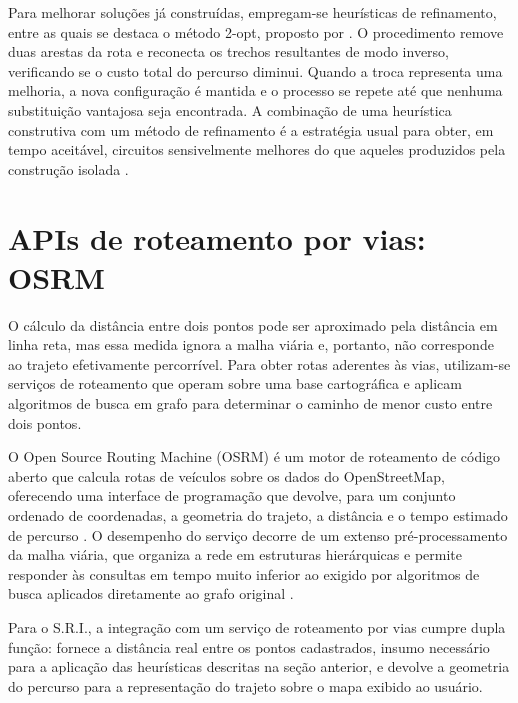Para melhorar soluções já construídas, empregam-se heurísticas de refinamento, entre as quais se destaca o método 2-opt, proposto por . O procedimento remove duas arestas da rota e reconecta os trechos resultantes de modo inverso, verificando se o custo total do percurso diminui. Quando a troca representa uma melhoria, a nova configuração é mantida e o processo se repete até que nenhuma substituição vantajosa seja encontrada. A combinação de uma heurística construtiva com um método de refinamento é a estratégia usual para obter, em tempo aceitável, circuitos sensivelmente melhores do que aqueles produzidos pela construção isolada \cite{croes1958}.

\section{APIs de roteamento por vias: OSRM}

O cálculo da distância entre dois pontos pode ser aproximado pela distância em linha reta, mas essa medida ignora a malha viária e, portanto, não corresponde ao trajeto efetivamente percorrível. Para obter rotas aderentes às vias, utilizam-se serviços de roteamento que operam sobre uma base cartográfica e aplicam algoritmos de busca em grafo para determinar o caminho de menor custo entre dois pontos.

O Open Source Routing Machine (OSRM) é um motor de roteamento de código aberto que calcula rotas de veículos sobre os dados do OpenStreetMap, oferecendo uma interface de programação que devolve, para um conjunto ordenado de coordenadas, a geometria do trajeto, a distância e o tempo estimado de percurso \cite{osrm2024}. O desempenho do serviço decorre de um extenso pré-processamento da malha viária, que organiza a rede em estruturas hierárquicas e permite responder às consultas em tempo muito inferior ao exigido por algoritmos de busca aplicados diretamente ao grafo original \cite{luxen2011}.

Para o S.R.I., a integração com um serviço de roteamento por vias cumpre dupla função: fornece a distância real entre os pontos cadastrados, insumo necessário para a aplicação das heurísticas descritas na seção anterior, e devolve a geometria do percurso para a representação do trajeto sobre o mapa exibido ao usuário.
